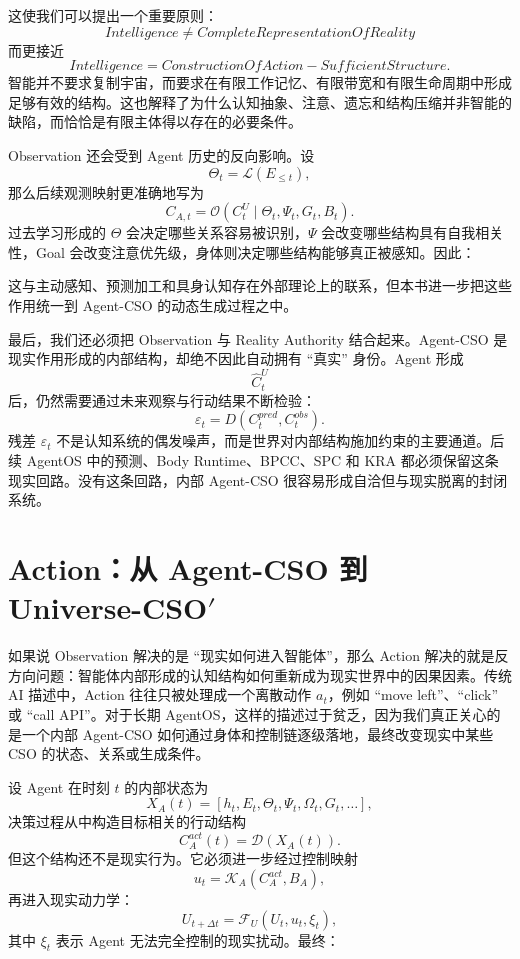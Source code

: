 这使我们可以提出一个重要原则：
\[
\boxed{
Intelligence
\neq
CompleteRepresentationOfReality
}
\]
而更接近
\[
\boxed{
Intelligence
=
ConstructionOfAction-SufficientStructure.
}
\]
智能并不要求复制宇宙，而要求在有限工作记忆、有限带宽和有限生命周期中形成足够有效的结构。这也解释了为什么认知抽象、注意、遗忘和结构压缩并非智能的缺陷，而恰恰是有限主体得以存在的必要条件。

Observation 还会受到 Agent 历史的反向影响。设
\[
\Theta_t
=
\mathcal{L}(E_{\leq t}),
\]
那么后续观测映射更准确地写为
\[
C_{A,t}
=
\mathcal{O}
\left(
C_t^U
\mid
\Theta_t,\Psi_t,G_t,B_t
\right).
\]
过去学习形成的 $\Theta$ 会决定哪些关系容易被识别，$\Psi$ 会改变哪些结构具有自我相关性，Goal 会改变注意优先级，身体则决定哪些结构能够真正被感知。因此：
\begin{statementbox}
\centering
{}
\end{statementbox}
这与主动感知、预测加工和具身认知存在外部理论上的联系，但本书进一步把这些作用统一到 Agent-CSO 的动态生成过程之中。

最后，我们还必须把 Observation 与 Reality Authority 结合起来。Agent-CSO 是现实作用形成的内部结构，却绝不因此自动拥有 ``真实'' 身份。Agent 形成
\[
\hat C_t^U
\]
后，仍然需要通过未来观察与行动结果不断检验：
\[
\varepsilon_t
=
D
\left(
C^{pred}_{t},
C^{obs}_{t}
\right).
\]
残差 $\varepsilon_t$ 不是认知系统的偶发噪声，而是世界对内部结构施加约束的主要通道。后续 AgentOS 中的预测、Body Runtime、BPCC、SPC 和 KRA 都必须保留这条现实回路。没有这条回路，内部 Agent-CSO 很容易形成自洽但与现实脱离的封闭系统。


\section{Action：从 Agent-CSO 到 Universe-CSO$'$}

如果说 Observation 解决的是 ``现实如何进入智能体''，那么 Action 解决的就是反方向问题：智能体内部形成的认知结构如何重新成为现实世界中的因果因素。传统 AI 描述中，Action 往往只被处理成一个离散动作 $a_t$，例如 ``move left''、``click'' 或 ``call API''。对于长期 AgentOS，这样的描述过于贫乏，因为我们真正关心的是一个内部 Agent-CSO 如何通过身体和控制链逐级落地，最终改变现实中某些 CSO 的状态、关系或生成条件。

设 Agent 在时刻 $t$ 的内部状态为
\[
X_A(t)
=
[h_t,E_t,\Theta_t,\Psi_t,\Omega_t,G_t,\ldots],
\]
决策过程从中构造目标相关的行动结构
\[
C_A^{act}(t)
=
\mathcal{D}
\left(
X_A(t)
\right).
\]
但这个结构还不是现实行为。它必须进一步经过控制映射
\[
u_t
=
\mathcal{K}_A
\left(
C_A^{act},
B_A
\right),
\]
再进入现实动力学：
\[
U_{t+\Delta t}
=
\mathcal{F}_U
\left(
U_t,
u_t,
\xi_t
\right),
\]
其中 $\xi_t$ 表示 Agent 无法完全控制的现实扰动。最终：
\begin{statementbox}
\centering
{}
\end{statementbox}

